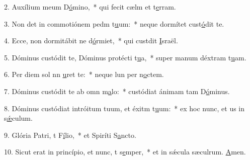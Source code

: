 2. Auxílium meum  D\uline{ó}mino,~* qui fecit cælm et t\uline{e}rram.\par 
3. Non det in commotiónem pedm t\uline{u}um:~* neque dormítet  cust\uline{ó}dit te.\par 
4. Ecce, non dormitábit ne d\uline{ó}rmiet,~* qui custdit \uline{I}sraël.\par 
5. Dóminus custódit te, Dóminus protécti t\uline{u}a,~* super manum déxtram t\uline{u}am.\par 
6. Per diem sol nn \uline{u}ret te:~* neque lun per n\uline{o}ctem.\par 
7. Dóminus custódit te ab omn m\uline{a}lo:~* custódiat ánimam tam D\uline{ó}minus.\par 
8. Dóminus custódiat intróitum tuum, et éxitm t\uline{u}um:~* ex hoc nunc, et us in s\uline{ǽ}culum.\par 
9. Glória Patri, t F\uline{í}lio,~* et Spiríti S\uline{a}ncto.\par 
10. Sicut erat in princípio, et nunc, t s\uline{e}mper,~* et in sǽcula sæculrum. \uline{A}men.\par 
